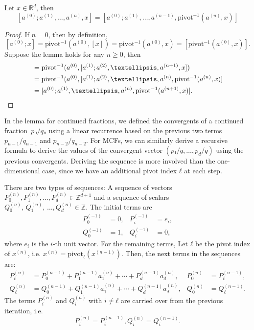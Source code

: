 \begin{lemma}
  \label{lem:mcf-nesting}
  Let $x ∈ ℝ^d$, then
  \[
    [a^{(0)}; a^{(1)}, …, a^{(n)}, x]
    = [a^{(0)}; a^{(1)}, …, a^{(n-1)}, \mathrm{pivot}^{-1}(a^{(n)}, x)]
  \]
\end{lemma}

\begin{proof}
  If $n = 0$, then by definition,
  \[
    [a^{(0)}; x] = \mathrm{pivot}^{-1}(a^{(0)}, [x]) = \mathrm{pivot}^{-1}(a^{(0)}, x) = [\mathrm{pivot}^{-1}(a^{(0)}, x)].
  \]
  Suppose the lemma holds for any $n ≥ 0$, then
  \begin{align*}
    [a^{(0)}; a^{(1)}, …, a^{(n+1)}, x]
    & = \mathrm{pivot}^{-1}(a^{(0)}, [a^{(1)}; a^{(2)}, …, a^{(n+1)}, x]) \\
    & = \mathrm{pivot}^{-1}(a^{(0)}, [a^{(1)}; a^{(2)}, …, a^{(n)}, \mathrm{pivot}^{-1}(a^{(n)}, x)] \\
    & = [a^{(0)}; a^{(1)}, …, a^{(n)}, \mathrm{pivot}^{-1}(a^{(n+1)}, x)]. \qedhere
  \end{align*}
\end{proof}

In the lemma for continued fractions,
we defined the convergents of a continued fraction~$pₙ/qₙ$
using a linear recurrence based on the previous two terms~$p_{n-1}/q_{n-1}$ and $p_{n-2}/q_{n-2}$.
For MCFs, we can similarly derive a recursive formula to derive the values of
the convergent vector $(p₁/q, \dots, p_d/q)$ using the previous convergents.
Deriving the sequence is more involved than the one-dimensional case,
since we have an additional pivot index $ℓ$ at each step.

There are two types of sequences:
A sequence of vectors $P_0^{(n)}, P_1^{(n)}, …, P_d^{(n)} ∈ ℤ^{d+1}$ and a sequence
of scalars $Q_0^{(n)}\!,\, Q_1^{(n)}\!,\, …, Q_d^{(n)} ∈ ℤ$.
The initial terms are
\[
  \begin{aligned}
    P_0^{(-1)} & = 0, & P_i^{(-1)} & = e_i, \\
    Q_0^{(-1)} & = 1, & Q_i^{(-1)} & = 0,
  \end{aligned}
\]
where $e_i$ is the $i$-th unit vector.
For the remaining terms,
Let $ℓ$ be the pivot index of $x^{(n)}$, i.e. $x^{(n)} = \mathrm{pivot}_ℓ(x^{(n-1)})$.
Then, the next terms in the sequences are:
\begin{equation}
  \label{eq:wallis}
  \begin{aligned}
    P_ℓ^{(n)} & = P_0^{(n-1)} + P_1^{(n-1)} a_1^{(n)} + ⋯ + P_d^{(n-1)} a_d^{(n)}, &
    P_0^{(n)} & = P_ℓ^{(n-1)}, \\
    Q_ℓ^{(n)} & = Q_0^{(n-1)} + Q_1^{(n-1)} a_1^{(n)} + ⋯ + Q_d^{(n-1)} a_d^{(n)}, &
    Q_0^{(n)} & = Q_ℓ^{(n-1)}.
  \end{aligned}
\end{equation}
The terms $P_i^{(n)}$ and $Q_i^{(n)}$ with $i ≠ ℓ$ are carried over from the previous iteration,
i.e.
\[
  P_i^{(n)} = P_i^{(n-1)}, Q_i^{(n)} = Q_i^{(n-1)}.
\]

